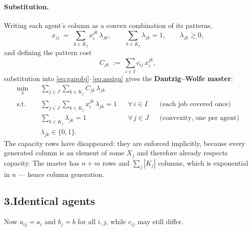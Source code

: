 \documentclass[11pt]{article}
\DeclareMathOperator*{\minimize}{min}
\theoremstyle{definition}
\theoremstyle{plain}
\begin{document}
\paragraph{Substitution.} Writing each agent's column as a convex
combination of its patterns,
\[
  x_{ij} \;=\; \sum_{k \in K_j} x^{jk}_i\, \lambda_{jk},
  \qquad
  \sum_{k \in K_j} \lambda_{jk} = 1,
  \qquad \lambda_{jk} \ge 0,
\]
and defining the pattern cost
\[
  C_{jk} \;:=\; \sum_{i \in I} c_{ij}\, x^{jk}_i ,
\]
substitution into \eqref{eq:gapobj}--\eqref{eq:assign} gives the
\textbf{Dantzig--Wolfe master}:
\begin{align}
  \minimize_{\lambda} \quad
    & \sum_{j \in J} \sum_{k \in K_j} C_{jk}\, \lambda_{jk} \\
  \text{s.t.} \quad
    & \sum_{j \in J} \sum_{k \in K_j} x^{jk}_i\, \lambda_{jk} = 1
      && \forall\, i \in I && \text{(each job covered once)}
      \label{eq:mcover}\\
    & \sum_{k \in K_j} \lambda_{jk} = 1
      && \forall\, j \in J && \text{(convexity, one per agent)}
      \label{eq:mconv}\\
    & \lambda_{jk} \in \{0,1\} .
\end{align}
The capacity rows have disappeared: they are enforced implicitly,
because every generated column is an element of some $X_j$ and therefore
already respects capacity. The master has $n + m$ rows and
$\sum_j |K_j|$ columns, which is exponential in $n$ --- hence column
generation.

\subsection*{3.\quad Identical agents}

Now $a_{ij} = a_i$ and $b_j = b$ for all $i, j$, while $c_{ij}$ may
still differ.
\end{document}
